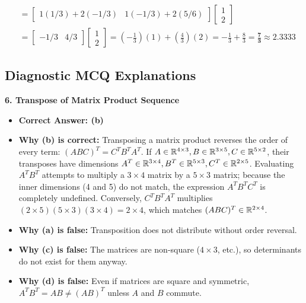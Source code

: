 \begin{enumerate}
\begin{align*}
    &= \begin{bmatrix} 1(1/3) + 2(-1/3) & 1(-1/3) + 2(5/6) \end{bmatrix} \begin{bmatrix} 1 \\ 2 \end{bmatrix} \\
    &= \begin{bmatrix} -1/3 & 4/3 \end{bmatrix} \begin{bmatrix} 1 \\ 2 \end{bmatrix} = \left(-\frac{1}{3}\right)(1) + \left(\frac{4}{3}\right)(2) = -\frac{1}{3} + \frac{8}{3} = \mathbf{\frac{7}{3} \approx 2.3333}
    \end{align*}
\end{enumerate}

\subsection*{Diagnostic MCQ Explanations}

\textbf{6. Transpose of Matrix Product Sequence}
\begin{itemize}
    \item \textbf{Correct Answer: (b)}
    \item \textbf{Why (b) is correct:} Transposing a matrix product reverses the order of every term: $(ABC)^T = C^T B^T A^T$. If $A \in \mathbb{R}^{4 \times 3}, B \in \mathbb{R}^{3 \times 5}, C \in \mathbb{R}^{5 \times 2}$, their transposes have dimensions $A^T \in \mathbb{R}^{3 \times 4}, B^T \in \mathbb{R}^{5 \times 3}, C^T \in \mathbb{R}^{2 \times 5}$. Evaluating $A^T B^T$ attempts to multiply a $3 \times 4$ matrix by a $5 \times 3$ matrix; because the inner dimensions (4 and 5) do not match, the expression $A^T B^T C^T$ is completely undefined. Conversely, $C^T B^T A^T$ multiplies $(2 \times 5)(5 \times 3)(3 \times 4) = 2 \times 4$, which matches $(ABC)^T \in \mathbb{R}^{2 \times 4}$.
    \item \textbf{Why (a) is false:} Transposition does not distribute without order reversal.
    \item \textbf{Why (c) is false:} The matrices are non-square ($4 \times 3$, etc.), so determinants do not exist for them anyway.
    \item \textbf{Why (d) is false:} Even if matrices are square and symmetric, $A^T B^T = AB \neq (AB)^T$ unless $A$ and $B$ commute.
\end{itemize}

